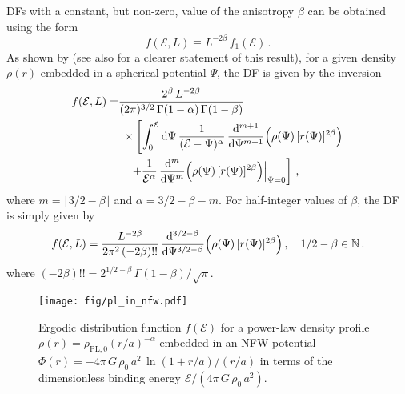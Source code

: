 DFs with a constant, but non-zero, value of the anisotropy $\beta$ can be obtained using the form
\begin{equation}\label{eq-constantbetadf-form}
    f(\mathcal{E},L) \equiv L^{-2\beta}\,f_1(\mathcal{E})\,.
\end{equation}
As shown by \citet{Cuddeford91a} (see also \citealt{An06a} for a clearer statement of this result), for a given density $\rho(r)$ embedded in a spherical potential $\Psi$, the DF is given by the inversion 
\begin{equation}\label{eq-anidf-constbeta-generalsol}
\begin{split}
    f(\mathcal{E},L) =  & {2^\beta\,L^{-2\beta} \over (2\pi)^{3/2}\,\Gamma(1-\alpha)\,\Gamma(1-\beta)}\\&\ \times \left[\int_0^\mathcal{E}\mathrm{d}\Psi\,{1\over (\mathcal{E}-\Psi)^\alpha}\,{\mathrm{d}^{m+1} \over \mathrm{d} \Psi^{m+1}}\Big(\rho(\Psi)\,[r(\Psi)]^{2\beta}\Big)\right.\\& \quad \left. +{1\over \mathcal{E}^\alpha}\,{\mathrm{d}^{m} \over \mathrm{d} \Psi^{m}}\Big(\rho(\Psi)\,[r(\Psi)]^{2\beta}\Big)\Big|_{\Psi=0}\right]\,,
\end{split}
\end{equation}
where $m = \lfloor 3/2-\beta \rfloor$ and $\alpha = 3/2-\beta-m$. For half-integer values of $\beta$, the DF is simply given by
\begin{equation}\label{eq-anidf-constbeta-halfinteger}
    f(\mathcal{E},L) = {L^{-2\beta} \over 2\pi^2\,(-2\beta)!!}\,{\mathrm{d}^{3/2-\beta} \over \mathrm{d} \Psi^{3/2-\beta}}\Big(\rho(\Psi)\,[r(\Psi)]^{2\beta}\Big)\,,\quad 1/2-\beta \in \mathbb{N}\,.
\end{equation}
where $(-2\beta)!! = 2^{1/2-\beta}\,\Gamma(1-\beta)/\sqrt{\pi}$.

\begin{figure}
	\centering
	\texttt{[image: fig/pl\_in\_nfw.pdf]}
	\caption{Ergodic distribution function $f(\mathcal{E})$ for a power-law density profile $\rho(r) = \rho_{\mathrm{PL},0} (r/a)^{-\alpha}$ embedded in an NFW potential $\Phi(r) = -4\pi\,G\,\rho_0\,a^2\,\ln(1+r/a)/(r/a)$ in terms of the dimensionless binding energy $\mathcal{E}/(4\pi\,G\,\rho_0\,a^2)$.}
	\label{fig:pl_in_nfw}
\end{figure}

